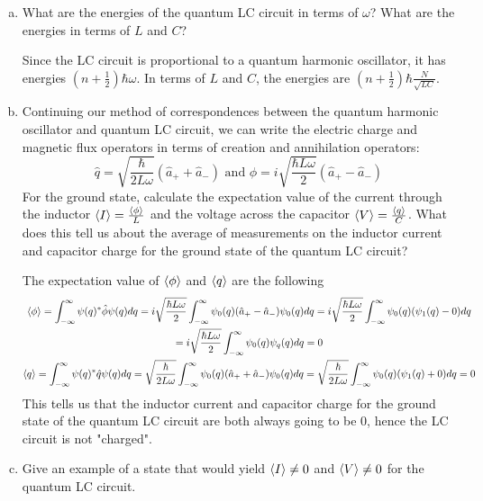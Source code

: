 \documentclass[10pt,letterpaper]{article}
\begin{document}
\begin{enumerate}
\begin{enumerate}[a)]
\item What are the energies of the quantum LC circuit in terms of $\omega$? What are the energies in terms of $L$ and $C$?

\color{violet}
Since the LC circuit is proportional to a quantum harmonic oscillator, it has energies $\left(n + \frac{1}{2}\right)\hbar\omega$. In terms of $L$ and $C$, the energies are $\left(n + \frac{1}{2}\right)\hbar\frac{N}{\sqrt{LC}}$. 
\color{black}

\item Continuing our method of correspondences between the quantum harmonic oscillator and quantum LC circuit, we can write the electric charge and magnetic flux operators in terms of creation and annihilation operators:
$$\hat{q} = \sqrt{\frac{\hbar}{2L\omega}}(\hat{a}_{+} + \hat{a}_{-}) \text{ and } \hat{\phi} = i\sqrt{\frac{\hbar L\omega}{2}}(\hat{a}_{+} - \hat{a}_{-})$$
For the ground state, calculate the expectation value of the current through the inductor $\braket{I} = \frac{\braket{\phi}}{L}$ and the voltage across the capacitor $\braket{V} = \frac{\braket{q}}{C}$. What does this tell us about the average of measurements on the inductor current and capacitor charge for the ground state of the quantum LC circuit?

\color{violet}
The expectation value of $\braket{\phi}$ and $\braket{q}$ are the following
\begin{gather*}
\braket{\phi} = \int_{-\infty}^{\infty} \psi(q)^{*} \hat{\phi} \psi(q) dq = i\sqrt{\frac{\hbar L\omega}{2}} \int_{-\infty}^{\infty} \psi_{0}(q) (\hat{a}_{+} - \hat{a}_{-}) \psi_{0}(q) dq = i\sqrt{\frac{\hbar L\omega}{2}} \int_{-\infty}^{\infty} \psi_{0}(q) (\psi_{1}(q) - 0) dq \\
= i\sqrt{\frac{\hbar L\omega}{2}} \int_{-\infty}^{\infty} \psi_{0}(q)\psi_{q}(q) dq = 0\\
\braket{q} = \int_{-\infty}^{\infty} \psi(q)^{*} \hat{q} \psi(q)dq =  \sqrt{\frac{\hbar}{2L\omega}} \int_{-\infty}^{\infty} \psi_{0}(q) (\hat{a}_{+} + \hat{a}_{-}) \psi_{0}(q) dq = \sqrt{\frac{\hbar}{2L\omega}} \int_{-\infty}^{\infty} \psi_{0}(q) (\psi_{1}(q) + 0) dq = 0
\end{gather*}
This tells us that the inductor current and capacitor charge for the ground state of the quantum LC circuit are both always going to be 0, hence the LC circuit is not "charged". 
\color{black}

\item Give an example of a state that would yield $\braket{I} \neq 0$ and $\braket{V} \neq 0$ for the quantum LC circuit. 


\end{enumerate}
\end{enumerate}
\end{document}
